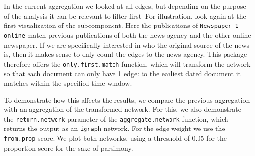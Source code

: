 \documentclass[]{article}
\newenvironment{Shaded}{\begin{snugshade}}{\end{snugshade}}
\newcommand{\KeywordTok}[1]{\textcolor[rgb]{0.13,0.29,0.53}{\textbf{{#1}}}}
\newcommand{\DataTypeTok}[1]{\textcolor[rgb]{0.13,0.29,0.53}{{#1}}}
\newcommand{\DecValTok}[1]{\textcolor[rgb]{0.00,0.00,0.81}{{#1}}}
\newcommand{\FloatTok}[1]{\textcolor[rgb]{0.00,0.00,0.81}{{#1}}}
\newcommand{\StringTok}[1]{\textcolor[rgb]{0.31,0.60,0.02}{{#1}}}
\newcommand{\NormalTok}[1]{{#1}}
\begin{document}
In the current aggregation we looked at all edges, but depending on the
purpose of the analysis it can be relevant to filter first. For
illustration, look again at the first visualization of the subcomponent.
Here the publications of \texttt{Newspaper 1 online} match previous
publications of both the news agency and the other online newspaper. If
we are specifically interested in who the original source of the news
is, then it makes sense to only count the edges to the news agency. This
package therefore offers the \texttt{only.first.match} function, which
will transform the network so that each document can only have 1 edge:
to the earliest dated document it matches within the specified time
window.

To demonstrate how this affects the results, we compare the previous
aggregation with an aggregation of the transformed network. For this, we
also demonstrate the \texttt{return.network} parameter of the
\texttt{aggregate.network} function, which returns the output as an
\texttt{igraph} network. For the edge weight we use the
\texttt{from.prop} score. We plot both networks, using a threshold of
0.05 for the proportion score for the sake of parsimony.

\begin{Shaded}
\end{Shaded}
\end{document}
